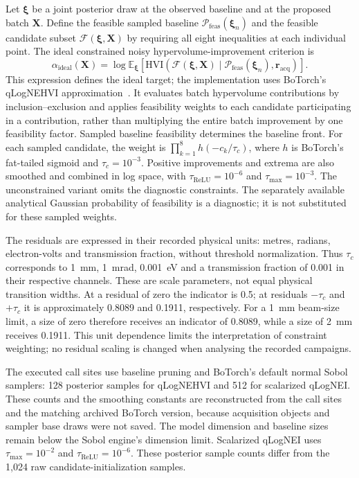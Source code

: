 Let $\boldsymbol{\xi}$ be a joint posterior draw at the observed baseline and
at the proposed batch $\mathbf{X}$. Define the feasible sampled baseline
$\mathcal{P}_{\mathrm{feas}}(\boldsymbol{\xi}_n)$ and the feasible candidate
subset $\mathcal{F}(\boldsymbol{\xi},\mathbf{X})$ by requiring all eight
inequalities at each individual point. The ideal constrained noisy
hypervolume-improvement criterion is
\begin{equation}
 \alpha_{\mathrm{ideal}}(\mathbf{X})=
 \log\mathbb{E}_{\boldsymbol{\xi}}\!\left[
 \mathrm{HVI}\!\left(\mathcal{F}(\boldsymbol{\xi},\mathbf{X})\mid
 \mathcal{P}_{\mathrm{feas}}(\boldsymbol{\xi}_n),\mathbf{r}_{\mathrm{acq}}\right)
 \right].
 \label{eq:qlognehvi}
\end{equation}
This expression defines the ideal target; the implementation uses BoTorch's
qLogNEHVI approximation~\cite{Daulton2021,Ament2023}. It evaluates batch
hypervolume contributions by inclusion--exclusion and applies feasibility
weights to each candidate participating in a contribution, rather than
multiplying the entire batch improvement by one feasibility factor. Sampled
baseline feasibility determines the baseline front. For each sampled candidate,
the weight is $\prod_{k=1}^{8}h(-c_k/\tau_c)$, where $h$ is BoTorch's
fat-tailed sigmoid and $\tau_c=10^{-3}$. Positive improvements and extrema are
also smoothed and combined in log space, with $\tau_{\mathrm{ReLU}}=10^{-6}$
and $\tau_{\max}=10^{-3}$. The unconstrained variant omits the diagnostic
constraints. The separately available analytical Gaussian probability of
feasibility is a diagnostic; it is not substituted for these sampled weights.

The residuals are expressed in their recorded physical units: metres, radians,
electron-volts and transmission fraction, without threshold normalization.
Thus $\tau_c$ corresponds to \SI{1}{\milli\metre},
\SI{1}{\milli\radian}, \SI{0.001}{\electronvolt} and a transmission
fraction of 0.001 in their respective channels. These are scale parameters,
not equal physical transition widths. At a residual of zero the indicator is
0.5; at residuals $-\tau_c$ and $+\tau_c$ it is approximately 0.8089 and
0.1911, respectively. For a \SI{1}{\milli\metre} beam-size limit,
a size of zero therefore receives an indicator of 0.8089, while a size of
\SI{2}{\milli\metre} receives 0.1911. This unit dependence limits the
interpretation of constraint weighting; no residual scaling is changed when
analysing the recorded campaigns.

The executed call sites use baseline pruning and BoTorch's default normal
Sobol samplers: 128 posterior samples for qLogNEHVI and 512 for scalarized
qLogNEI. These counts and the smoothing constants are reconstructed from the
call sites and the matching archived BoTorch version, because acquisition
objects and sampler base draws were not saved. The model dimension and baseline
sizes remain below the Sobol engine's dimension limit. Scalarized qLogNEI uses
$\tau_{\max}=10^{-2}$ and $\tau_{\mathrm{ReLU}}=10^{-6}$. These posterior
sample counts differ from the 1,024 raw candidate-initialization samples.

